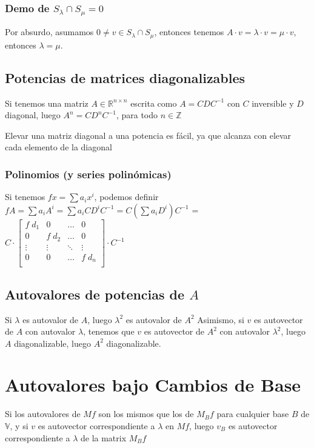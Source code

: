 \documentclass{article}
\def\R{\mathbb{R}}
\def\Z{\mathbb{Z}}
\def\V{\mathbb{V}}
\begin{document}
\subsubsection{Demo de $S_\lambda \cap S_\mu = 0$}
Por absurdo, asumamos $0 \neq v \in S_\lambda \cap S_\mu$, entonces tenemos
$A\cdot v = \lambda \cdot v = \mu \cdot v$, entonces $\lambda = \mu$.
\subsection{Potencias de matrices diagonalizables}
Si tenemos una matriz $A \in \R^{n\times n}$ escrita como $A = CDC^{-1}$ con
$C$ inversible y $D$ diagonal, luego $A^n = CD^nC^{-1}$, para todo $n \in \Z$

Elevar una matriz diagonal a una potencia es fácil, ya que alcanza con
elevar cada elemento de la diagonal

\subsubsection{Polinomios (y series polinómicas)}
Si tenemos $fx = \sum a_ix^i$, podemos definir $fA = \sum a_iA^i = \sum
a_iCD^iC^{-1} = C \left(\sum a_iD^i\right) C^{-1}$ = \(
	C \cdot \begin{bmatrix}
		f\; d_1 & 0 & \dots & 0 \\
		0 & f \; d_2 & \dots & 0 \\
		\vdots & \vdots & \ddots & \vdots \\
		0 & 0 & \dots & f \; d_n \\
	\end{bmatrix} \cdot C^{-1}
\)

\subsection{Autovalores de potencias de $A$}
Si $\lambda$ es autovalor de $A$, luego $\lambda^2$ es autovalor de $A^2$
Asimismo, si $v$ es autovector de $A$ con autovalor $\lambda$, tenemos que
$v$ es autovector de $A^2$ con autovalor $\lambda^2$, luego $A$
diagonalizable, luego $A^2$ diagonalizable.

\section{Autovalores bajo Cambios de Base}
Si los autovalores de $Mf$ son los mismos que los de $M_Bf$ para cualquier
base $B$ de $\V$, y si $v$ es autovector correspondiente a $\lambda$ en
$Mf$, luego $v_B$ es autovector correspondiente a $\lambda$ de la matrix
$M_Bf$
\end{document}
